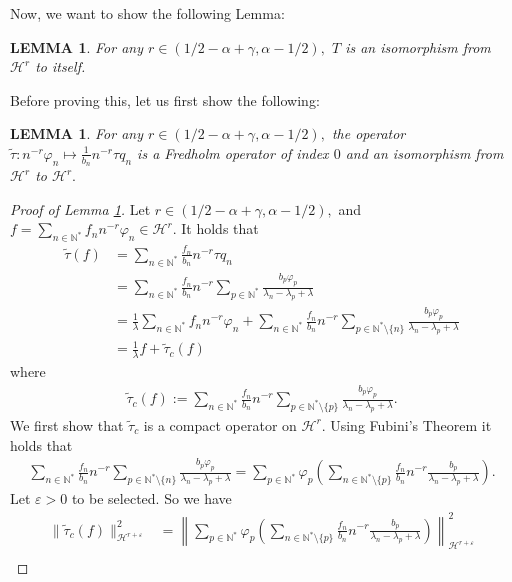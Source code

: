 \documentclass[11pt, dvipsnames]{amsart}
\newtheorem{lem}[theorem]{LEMMA}
\begin{document}
Now, we want to show the following Lemma:
\begin{lem} \label{lemma-T-invertible}
    For any $r\in (1/2-\alpha+\gamma,\alpha-1/2),$ $T$ is an isomorphism from $\mathcal{H}^r$ to itself.
\end{lem}
Before proving this, let us first show the following:
\begin{lem}\label{lem-tilde-tau}
    For any $r\in (1/2-\alpha+\gamma,\alpha-1/2),$ the operator $\tilde \tau: n^{-r}\varphi_n\mapsto \frac{1}{b_n}n^{-r}\tau q_n$ is a Fredholm operator of index $0$ and an isomorphism from $\mathcal{H}^r$ to $\mathcal{H}^r.$
\end{lem}
\begin{proof}[Proof of Lemma \ref{lem-tilde-tau}]
    Let $r\in (1/2-\alpha+\gamma,\alpha-1/2),$ and $f=\displaystyle\sum_{n\in \mathbb{N^*}}f_n n^{-r}\varphi_n\in \mathcal{H}^r.$ It holds that
    \begin{align*}
        \tilde \tau(f)&=\sum_{n\in \mathbb{N^*}}\frac{f_n}{b_n} n^{-r}\tau q_n\\
        &=\sum_{n\in \mathbb{N^*}}\frac{f_n}{b_n} n^{-r}\sum_{p\in \mathbb{N}^*}\frac{b_{p}\varphi_p}{\lambda_n-\lambda_p+\lambda}\\
        &=\frac{1}{\lambda}\sum_{n\in \mathbb{N^*}}f_n n^{-r}\varphi_n+\sum_{n\in \mathbb{N^*}}\frac{f_n}{b_n} n^{-r}\sum_{p\in \mathbb{N}^*\setminus\{n\}}\frac{b_{p}\varphi_p}{\lambda_n-\lambda_p+\lambda}\\
        &=\frac{1}{\lambda}f+\tilde\tau_c(f)
    \end{align*}
    where 
    \begin{align*}
        \tilde\tau_c(f):=\sum_{n\in \mathbb{N^*}}\frac{f_n}{b_n} n^{-r}\sum_{p\in \mathbb{N}^*\setminus\{p\}}\frac{b_{p}\varphi_p}{\lambda_n-\lambda_p+\lambda}.
    \end{align*}
    We first show that $\tilde \tau_c$ is a compact operator on $\mathcal{H}^r.$ Using Fubini's Theorem it holds that
    \begin{align*}
        \sum_{n\in \mathbb{N^*}}\frac{f_n}{b_n} n^{-r}\sum_{p\in \mathbb{N}^*\setminus\{n\}}\frac{b_{p}\varphi_p}{\lambda_n-\lambda_p+\lambda}=\sum_{p\in \mathbb{N^*}}\varphi_p\left(\sum_{n\in \mathbb{N}^*\setminus\{p\}}\frac{f_n}{b_n} n^{-r}\frac{b_{p}}{\lambda_n-\lambda_p+\lambda}\right).
    \end{align*}
    Let $\varepsilon>0$ to be selected. So we have
    \begin{align*}
        \|\tilde \tau_c(f)\|^2_{\mathcal{H}^{r+\varepsilon}}&=\left\|\sum_{p\in \mathbb{N^*}}\varphi_p\left(\sum_{n\in \mathbb{N}^*\setminus\{p\}}\frac{f_n}{b_n} n^{-r}\frac{b_{p}}{\lambda_n-\lambda_p+\lambda}\right)\right\|^2_{\mathcal{H}^{r+\varepsilon}}\\

\end{align*}
\end{proof}
\end{document}
